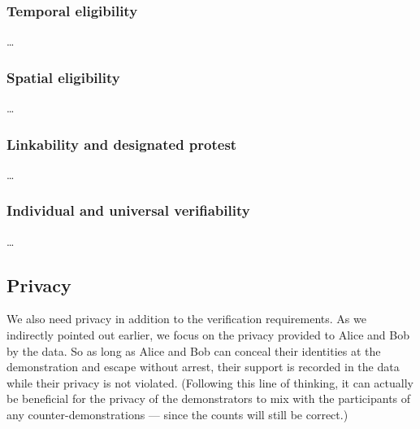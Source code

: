 \subsubsection{Temporal eligibility}

\begin{frame}
\begin{definition}
  \dots
\end{definition}
\end{frame}

\subsubsection{Spatial eligibility}

\begin{frame}
\begin{definition}
  \dots
\end{definition}
\end{frame}

\subsubsection{Linkability and designated protest}

\dots

\subsubsection{Individual and universal verifiability}

\dots

\subsection{Privacy}%
\label{Privacy}

We also need privacy in addition to the verification requirements.
As we indirectly pointed out earlier, we focus on the privacy provided to Alice 
and Bob by the data.
So as long as Alice and Bob can conceal their identities at the demonstration 
and escape without arrest, their support is recorded in the data while their 
privacy is not violated.
(Following this line of thinking, it can actually be beneficial for the privacy 
of the demonstrators to mix with the participants of any counter-demonstrations 
--- since the counts will still be correct.)

